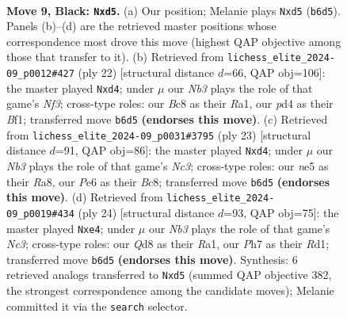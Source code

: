 \documentclass[11pt]{article}
\begin{document}
\clearpage

\begin{figure}[p]\centering
\begin{subfigure}{0.46\textwidth}\centering
\resizebox{\linewidth}{!}{%
\newchessgame
\chessboard[
  setfen={r1bqkb1r/pp3ppp/1np1p3/3NN3/2BP4/4P3/PP3PPP/R1BQK2R b KQkq - 0 9},
  showmover=false,
  pgfstyle=straightmove, color=movearrow, markmove={b6-d5}
]}
\caption{}
\end{subfigure}\hfill
\begin{subfigure}{0.46\textwidth}\centering
\resizebox{\linewidth}{!}{%
\newchessgame
\chessboard[
  setfen={r1bqk2r/1p3ppp/p3p3/2bn4/3n4/2P2NB1/PP3PPP/R2QKB1R w KQkq - 0 12},
  showmover=false,
  pgfstyle=straightmove, color=movearrow, markmove={f3-d4}
]}
\caption{}
\end{subfigure}
\\[4pt]
\begin{subfigure}{0.46\textwidth}\centering
\resizebox{\linewidth}{!}{%
\newchessgame
\chessboard[
  setfen={r1bqkb1r/1p2pppp/p1n5/2p4P/2BNP3/5N2/PP1P1PP1/R1BQ1K1R b kq - 0 12},
  showmover=false,
  pgfstyle=straightmove, color=movearrow, markmove={c6-d4}
]}
\caption{}
\end{subfigure}\hfill
\begin{subfigure}{0.46\textwidth}\centering
\resizebox{\linewidth}{!}{%
\newchessgame
\chessboard[
  setfen={r1b1r1k1/pp1nqpbp/2p3p1/4p3/2P1n3/2N3P1/PPQ1PPBP/R1BR2K1 w - - 0 13},
  showmover=false,
  pgfstyle=straightmove, color=movearrow, markmove={c3-e4}
]}
\caption{}
\end{subfigure}
\caption{\textbf{Move 9, Black: \texttt{Nxd5}.} (a) Our position; Melanie plays \texttt{Nxd5} (\texttt{b6d5}). Panels (b)--(d) are the retrieved master positions whose correspondence most drove this move (highest QAP objective among those that transfer to it). (b) Retrieved from \texttt{lichess\_elite\_2024-09\_p0012\#427} (ply 22) [structural distance $d$=66, QAP obj=106]: the master played \texttt{Nxd4}; under $\mu$ our \emph{Nb3} plays the role of that game's \emph{Nf3}; cross-type roles: our \emph{B}c8 as their \emph{R}a1, our \emph{p}d4 as their \emph{B}f1; transferred move \texttt{b6d5} \textbf{(endorses this move)}. (c) Retrieved from \texttt{lichess\_elite\_2024-09\_p0031\#3795} (ply 23) [structural distance $d$=91, QAP obj=86]: the master played \texttt{Nxd4}; under $\mu$ our \emph{Nb3} plays the role of that game's \emph{Nc3}; cross-type roles: our \emph{n}e5 as their \emph{R}a8, our \emph{P}e6 as their \emph{B}c8; transferred move \texttt{b6d5} \textbf{(endorses this move)}. (d) Retrieved from \texttt{lichess\_elite\_2024-09\_p0019\#434} (ply 24) [structural distance $d$=93, QAP obj=75]: the master played \texttt{Nxe4}; under $\mu$ our \emph{Nb3} plays the role of that game's \emph{Nc3}; cross-type roles: our \emph{Q}d8 as their \emph{R}a1, our \emph{P}h7 as their \emph{R}d1; transferred move \texttt{b6d5} \textbf{(endorses this move)}. Synthesis: 6 retrieved analogs transferred to \texttt{Nxd5} (summed QAP objective 382, the strongest correspondence among the candidate moves); Melanie committed it via the \texttt{search} selector.}
\label{fig:thought-m17}
\end{figure}
\end{document}
